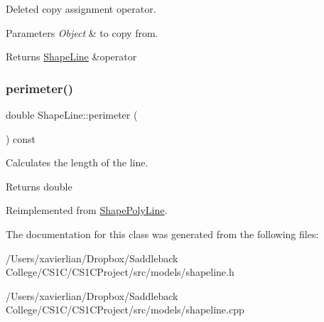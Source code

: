 Deleted copy assignment operator. 


\begin{DoxyParams}{Parameters}
{\em Object} & to copy from. \\
\hline
\end{DoxyParams}
\begin{DoxyReturn}{Returns}
\mbox{\hyperlink{class_shape_line}{Shape\+Line}} \&operator 
\end{DoxyReturn}
\mbox{\label{class_shape_line_a68b22013926993e9bd9c2d146519a5af}} 
\subsubsection{\texorpdfstring{perimeter()}{perimeter()}}
{\footnotesize\ttfamily double Shape\+Line\+::perimeter (\begin{DoxyParamCaption}{ }\end{DoxyParamCaption}) const\hspace{0.3cm}{\ttfamily [virtual]}}



Calculates the length of the line. 

\begin{DoxyReturn}{Returns}
double 
\end{DoxyReturn}


Reimplemented from \mbox{\hyperlink{class_shape_poly_line_a3d6664ada9c9dd883303a3dcb63d6188}{Shape\+Poly\+Line}}.



The documentation for this class was generated from the following files\+:\begin{DoxyCompactItemize}
\item 
/\+Users/xavierlian/\+Dropbox/\+Saddleback College/\+C\+S1\+C/\+C\+S1\+C\+Project/src/models/shapeline.\+h\item 
/\+Users/xavierlian/\+Dropbox/\+Saddleback College/\+C\+S1\+C/\+C\+S1\+C\+Project/src/models/shapeline.\+cpp\end{DoxyCompactItemize}
